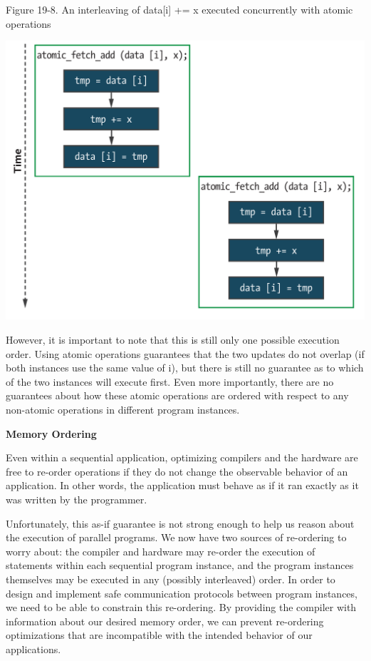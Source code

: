 \hspace*{\fill} \par %
Figure 19-8. An interleaving of data[i] += x executed concurrently with atomic operations
\begin{center}
	\includegraphics[width=1.0\textwidth]{content/chapter-19/images/5}
\end{center}

However, it is important to note that this is still only one possible execution order. Using atomic operations guarantees that the two updates do not overlap (if both instances use the same value of i), but there is still no guarantee as to which of the two instances will execute first. Even more importantly, there are no guarantees about how these atomic operations are ordered with respect to any non-atomic operations in different program instances.\par

\hspace*{\fill} \par %
\textbf{Memory Ordering}

Even within a sequential application, optimizing compilers and the hardware are free to re-order operations if they do not change the observable behavior of an application. In other words, the application must behave as if it ran exactly as it was written by the programmer.\par

Unfortunately, this as-if guarantee is not strong enough to help us reason about the execution of parallel programs. We now have two sources of re-ordering to worry about: the compiler and hardware may re-order the execution of statements within each sequential program instance, and the program instances themselves may be executed in any (possibly interleaved) order. In order to design and implement safe communication protocols between program instances, we need to be able to constrain this re-ordering. By providing the compiler with information about our desired memory order, we can prevent re-ordering optimizations that are incompatible with the intended behavior of our applications.\par

